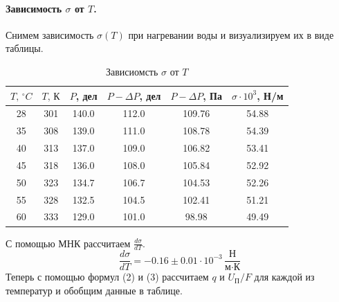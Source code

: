\documentclass{letnab}
\begin{document}
\paragraph{Зависимость $\sigma$ от $T$.} Снимем зависимость $\sigma(T)$ при нагревании воды и визуализируем их в виде таблицы.
\begin{table}[H]
	\centering
	\caption{Зависиомсть $\sigma$ от $T$}
	\begin{tabular}{cc|ccc|c}
		\toprule
		$T,\,^\circ C$ & $T,\,\text{К}$ & $P$, дел & $P - \Delta P$, дел & $P-\Delta P$, Па & $\sigma \cdot 10^3$, Н/м \\\midrule
		28            & 301            & 140.0      & 112.0                 & 109.76           & 54.88                    \\
		35            & 308            & 139.0      & 111.0                 & 108.78           & 54.39                    \\
		40            & 313            & 137.0      & 109.0                 & 106.82           & 53.41                    \\
		45            & 318            & 136.0      & 108.0                 & 105.84           & 52.92                    \\
		50            & 323            & 134.7   & 106.7              & 104.53         & 52.26                  \\
		55            & 328            & 132.5    & 104.5               & 102.41           & 51.21                   \\
		60            & 333            & 129.0      & 101.0                 & 98.98            & 49.49            \\ \bottomrule
	\end{tabular}
\end{table}
С помощью МНК рассчитаем $\frac{d\sigma}{dT}$.
\begin{equation}
\dfrac{d\sigma}{dT} = -0.16 \pm 0.01 \cdot 10^{-3}\,\frac{\text{Н}}{\text{м}\cdot\text{К}}
\end{equation} 
Теперь с помощью формул (2) и (3) рассчитаем $q$ и $U_\text{П}/F$ для каждой из температур и обобщим данные в таблице.
\end{document}
